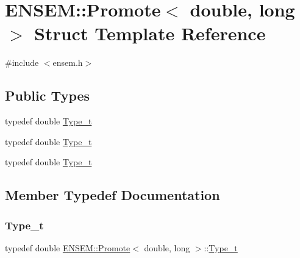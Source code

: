 \hypertarget{structENSEM_1_1Promote_3_01double_00_01long_01_4}{}\section{E\+N\+S\+EM\+:\+:Promote$<$ double, long $>$ Struct Template Reference}
\label{structENSEM_1_1Promote_3_01double_00_01long_01_4}


{\ttfamily \#include $<$ensem.\+h$>$}

\subsection*{Public Types}
\begin{DoxyCompactItemize}
\item 
typedef double \mbox{\hyperlink{structENSEM_1_1Promote_3_01double_00_01long_01_4_ab38f2aa99a29d60ef8d3393a5fe7d568}{Type\+\_\+t}}
\item 
typedef double \mbox{\hyperlink{structENSEM_1_1Promote_3_01double_00_01long_01_4_ab38f2aa99a29d60ef8d3393a5fe7d568}{Type\+\_\+t}}
\item 
typedef double \mbox{\hyperlink{structENSEM_1_1Promote_3_01double_00_01long_01_4_ab38f2aa99a29d60ef8d3393a5fe7d568}{Type\+\_\+t}}
\end{DoxyCompactItemize}


\subsection{Member Typedef Documentation}
\mbox{\label{structENSEM_1_1Promote_3_01double_00_01long_01_4_ab38f2aa99a29d60ef8d3393a5fe7d568}} 
\subsubsection{\texorpdfstring{Type\_t}{Type\_t}\hspace{0.1cm}{\footnotesize\ttfamily [1/3]}}
{\footnotesize\ttfamily typedef double \mbox{\hyperlink{structENSEM_1_1Promote}{E\+N\+S\+E\+M\+::\+Promote}}$<$ double, long $>$\+::\mbox{\hyperlink{structENSEM_1_1Promote_3_01double_00_01long_01_4_ab38f2aa99a29d60ef8d3393a5fe7d568}{Type\+\_\+t}}}

